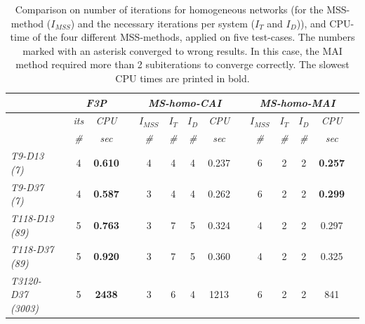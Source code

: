 \documentclass[10pt,journal]{article}
\begin{document}
\begin{table}[!ht]
\renewcommand{\arraystretch}{1.3}
\centering
\label{tab:resultsPIC3P}\hspace{2cm}
\begin{adjustbox}{width=1\textwidth} %
\small
\begin{tabular}{@{}l c cc c  cccc c cccc c  @{}}\toprule
                               && \multicolumn{2}{c}{\textit{F3P}} &&     \multicolumn{4}{c}{\textit{MS-homo-CAI}} && \multicolumn{4}{c}{\textit{MS-homo-MAI}} \\ \toprule 
\multicolumn{1}{l}{}        && \textit{its}      & \textit{CPU} && $I_{MSS}$      & $I_T$   &  $I_D$      & \textit{CPU}     &&$I_{MSS}$      & $I_T$   &  $I_D$      & \textit{CPU}      \\
\cmidrule{3-4}  \cmidrule{6-9}  \cmidrule{11-14}   
\multicolumn{1}{l}{}      && \textit{\#}       & \textit{sec} && \textit{\#}      & \textit{\#}    & \textit{\#}       & \textit{sec}     && \textit{\#}        & \textit{\#}     &  \textit{\#}       & \textit{sec}  \\
\midrule
\multicolumn{1}{l}{\textit{T9-D13 (7)}}      && 4 &\textbf{ 0.610}  && 4 & 4 & 4 &  0.237 && 6       & 2 & 2  & \textbf{0.257}\\
\multicolumn{1}{l}{\textit{T9-D37 (7)}}      && 4 & \textbf{0.587}    && 3 & 4 & 4 &  0.262 && 6       & 2 & 2  & \textbf{0.299}\\
\multicolumn{1}{l}{{\textit{T118-D13 (89)}}}   && 5 & \textbf{0.763}     && 3       & 7 & 5  & 0.324 && 4  & 2 &2 &  0.297  \\
\multicolumn{1}{l}{{\textit{T118-D37 (89)}}}   && 5 & \textbf{0.920}    && 3       & 7 & 5  & 0.360 && 4 & 2 & 2 &  0.325 \\
\multicolumn{1}{l}{{\textit{T3120-D37 (3003)}}}   && 5 & \textbf{2438}   &&  3 & 6  & 4  & 1213  && 6 & 2 & 2 &  841    \\
\toprule 
\end{tabular}
\end{adjustbox}
\caption{Comparison on number of iterations for homogeneous networks (for the MSS-method ($I_{MSS}$) and the necessary iterations per system ($I_T$ and $I_D$)), and CPU-time of the four different MSS-methods, applied on five test-cases. The numbers marked with an asterisk converged to wrong results. In this case, the MAI method required more than 2 subiterations to converge correctly. The slowest CPU times are printed in bold.}
\end{table}
\newpage

\end{document}

